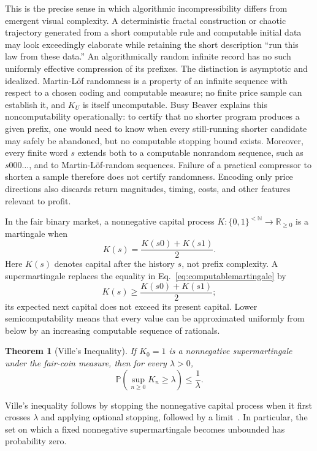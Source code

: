 \documentclass[aps,pra,reprint,superscriptaddress,amsmath,amssymb,floatfix]{revtex4-2}
\theoremstyle{plain}
\newtheorem{theorem}{Theorem}
\theoremstyle{definition}
\theoremstyle{remark}
\begin{document}
This is the precise sense in which algorithmic incompressibility differs from
emergent visual complexity. A deterministic fractal construction or chaotic
trajectory generated from a short computable rule and computable initial data
may look exceedingly elaborate while retaining the short description ``run
this law from these data.'' An algorithmically random infinite record has no
such uniformly effective compression of its prefixes. The distinction is
asymptotic and idealized. Martin-L\"of randomness is a property of an infinite
sequence with respect to a chosen coding and computable measure; no finite
price sample can establish it, and \(K_U\) is itself uncomputable. Busy Beaver
explains this noncomputability operationally: to certify that no shorter
program produces a given prefix, one would need to know when every still-running
shorter candidate may safely be abandoned, but no computable stopping bound
exists. Moreover, every finite word \(s\) extends both to a computable
nonrandom sequence, such as \(s000\ldots\), and to Martin-L\"of-random
sequences. Failure of a practical compressor to shorten a sample therefore
does not certify randomness. Encoding only price directions also discards
return magnitudes, timing, costs, and other features relevant to profit.

In the fair binary market, a nonnegative capital process
\(K\colon\{0,1\}^{<\mathbb{N}}\to\mathbb{R}_{\geq0}\) is a martingale when
\begin{equation}
  K(s)=\frac{K(s0)+K(s1)}2.
  \label{eq:computablemartingale}
\end{equation}
Here \(K(s)\) denotes capital after the history \(s\), not prefix complexity.
A supermartingale replaces the equality in
Eq.~\eqref{eq:computablemartingale} by
\[
  K(s)\geq\frac{K(s0)+K(s1)}2;
\]
its expected next capital does not exceed its present capital. Lower
semicomputability means that every value can be approximated uniformly from
below by an increasing computable sequence of rationals.

\begin{theorem}[Ville's Inequality]
  \label{thm:ville}
  If \(K_0=1\) is a nonnegative supermartingale under the fair-coin measure,
  then
  for every \(\lambda>0\),
  \begin{equation}
    \mathbb{P}\!\left(\sup_{n\geq0}K_n\geq\lambda\right)
    \leq\frac1\lambda.
    \label{eq:ville}
  \end{equation}
\end{theorem}

Ville's inequality follows by stopping the nonnegative capital process when it
first crosses \(\lambda\) and applying optional stopping, followed by a
limit~\cite{Ville1939}. In particular, the set on which a fixed nonnegative
supermartingale becomes unbounded has probability zero.
\end{document}
